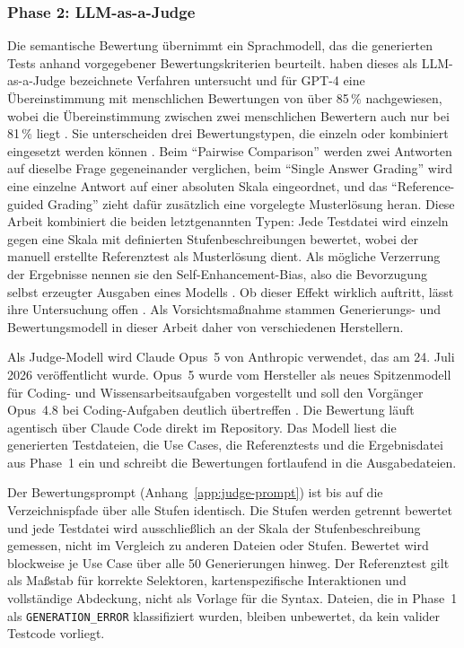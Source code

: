 \subsubsection{Phase 2: LLM-as-a-Judge}

Die semantische Bewertung übernimmt ein Sprachmodell, das die generierten Tests anhand vorgegebener Bewertungskriterien beurteilt. \textcite{zheng_judging_2023} haben dieses als LLM-as-a-Judge bezeichnete Verfahren untersucht und für GPT-4 eine Übereinstimmung mit menschlichen Bewertungen von über 85\,\% nachgewiesen, wobei die Übereinstimmung zwischen zwei menschlichen Bewertern auch nur bei 81\,\% liegt \parencite[S.~7]{zheng_judging_2023}. Sie unterscheiden drei Bewertungstypen, die einzeln oder kombiniert eingesetzt werden können \parencite[S.~4]{zheng_judging_2023}. Beim \enquote{Pairwise Comparison} werden zwei Antworten auf dieselbe Frage gegeneinander verglichen, beim \enquote{Single Answer Grading} wird eine einzelne Antwort auf einer absoluten Skala eingeordnet, und das \enquote{Reference-guided Grading} zieht dafür zusätzlich eine vorgelegte Musterlösung heran. Diese Arbeit kombiniert die beiden letztgenannten Typen: Jede Testdatei wird einzeln gegen eine Skala mit definierten Stufenbeschreibungen bewertet, wobei der manuell erstellte Referenztest als Musterlösung dient. Als mögliche Verzerrung der Ergebnisse nennen sie den Self-Enhancement-Bias, also die Bevorzugung selbst erzeugter Ausgaben eines Modells \parencite[S.~5]{zheng_judging_2023}. Ob dieser Effekt wirklich auftritt, lässt ihre Untersuchung offen \parencite[S.~5]{zheng_judging_2023}. Als Vorsichtsmaßnahme stammen Generierungs- und Bewertungsmodell in dieser Arbeit daher von verschiedenen Herstellern.

Als Judge-Modell wird Claude Opus~5 von Anthropic verwendet, das am 24. Juli 2026 veröffentlicht wurde. Opus~5 wurde vom Hersteller als neues Spitzenmodell für Coding- und Wissensarbeitsaufgaben vorgestellt und soll den Vorgänger Opus~4.8 bei Coding-Aufgaben deutlich übertreffen \parencite{anthropic_introducing_2026}. Die Bewertung läuft agentisch über Claude Code direkt im Repository. Das Modell liest die generierten Testdateien, die Use Cases, die Referenztests und die Ergebnisdatei aus Phase~1 ein und schreibt die Bewertungen fortlaufend in die Ausgabedateien.

Der Bewertungsprompt (Anhang~\ref{app:judge-prompt}) ist bis auf die Verzeichnispfade über alle Stufen identisch. Die Stufen werden getrennt bewertet und jede Testdatei wird ausschließlich an der Skala der Stufenbeschreibung gemessen, nicht im Vergleich zu anderen Dateien oder Stufen. Bewertet wird blockweise je Use Case über alle 50 Generierungen hinweg. Der Referenztest gilt als Maßstab für korrekte Selektoren, kartenspezifische Interaktionen und vollständige Abdeckung, nicht als Vorlage für die Syntax. Dateien, die in Phase~1 als \texttt{GENERATION\_ERROR} klassifiziert wurden, bleiben unbewertet, da kein valider Testcode vorliegt.

